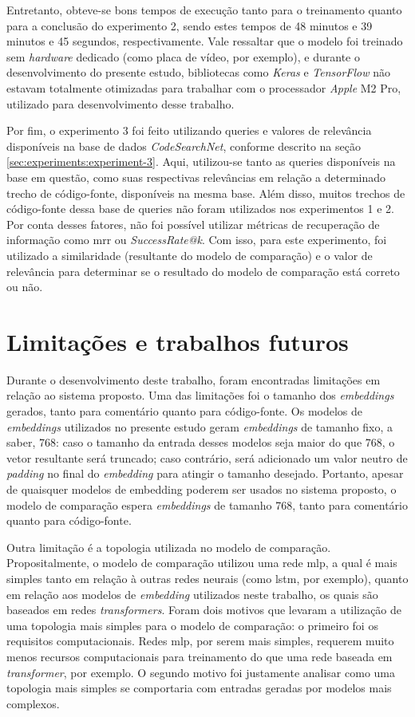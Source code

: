 Entretanto, obteve-se bons tempos de execução tanto para o treinamento quanto para a conclusão do experimento 2, sendo estes tempos de 48 minutos e 39 minutos e 45 segundos, respectivamente. Vale ressaltar que o modelo foi treinado sem \textit{hardware} dedicado (como placa de vídeo, por exemplo), e durante o desenvolvimento do presente estudo, bibliotecas como \textit{Keras} e \textit{TensorFlow} não estavam totalmente otimizadas para trabalhar com o processador \textit{Apple} M2 Pro, utilizado para desenvolvimento desse trabalho.

Por fim, o experimento 3 foi feito utilizando queries e valores de relevância disponíveis na base de dados \textit{CodeSearchNet}, conforme descrito na seção \ref{sec:experiments:experiment-3}. Aqui, utilizou-se tanto as queries disponíveis na base em questão, como suas respectivas relevâncias em relação a determinado trecho de código-fonte, disponíveis na mesma base. Além disso, muitos trechos de código-fonte dessa base de queries não foram utilizados nos experimentos 1 e 2. Por conta desses fatores, não foi possível utilizar métricas de recuperação de informação como \gls{mrr} ou \textit{SuccessRate@k}. Com isso, para este experimento, foi utilizado a similaridade (resultante do modelo de comparação) e o valor de relevância para determinar se o resultado do modelo de comparação está correto ou não.

\section{Limitações e trabalhos futuros}
\label{sec:discussions:future-works}

Durante o desenvolvimento deste trabalho, foram encontradas limitações em relação ao sistema proposto. Uma das limitações foi o tamanho dos \textit{embeddings} gerados, tanto para comentário quanto para código-fonte. Os modelos de \textit{embeddings} utilizados no presente estudo geram \textit{embeddings} de tamanho fixo, a saber, 768: caso o tamanho da entrada desses modelos seja maior do que 768, o vetor resultante será truncado; caso contrário, será adicionado um valor neutro de \textit{padding} no final do \textit{embedding} para atingir o tamanho desejado. Portanto, apesar de quaisquer modelos de embedding poderem ser usados no sistema proposto, o modelo de comparação espera \textit{embeddings} de tamanho 768, tanto para comentário quanto para código-fonte.

Outra limitação é a topologia utilizada no modelo de comparação. Propositalmente, o modelo de comparação utilizou uma rede \gls{mlp}, a qual é mais simples tanto em relação à outras redes neurais (como \gls{lstm}, por exemplo), quanto em relação aos modelos de \textit{embedding} utilizados neste trabalho, os quais são baseados em redes \textit{transformers}. Foram dois motivos que levaram a utilização de uma topologia mais simples para o modelo de comparação: o primeiro foi os requisitos computacionais. Redes \gls{mlp}, por serem mais simples, requerem muito menos recursos computacionais para treinamento do que uma rede baseada em \textit{transformer}, por exemplo. O segundo motivo foi justamente analisar como uma topologia mais simples se comportaria com entradas geradas por modelos mais complexos.

